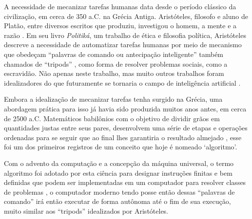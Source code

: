 \newcommand{\texCommand}[1]{\texttt{\textbackslash{#1}}}%

\newcommand{\exemplo}[1]{%
\vspace{\baselineskip}%
\noindent\fbox{\begin{minipage}{\textwidth}#1\end{minipage}}%
\\\vspace{\baselineskip}}%

\newcommand{\exemploVerbatim}[1]{%
\vspace{\baselineskip}%
\noindent\fbox{\begin{minipage}{\textwidth}%
#1\end{minipage}}%
\\\vspace{\baselineskip}}%

A necessidade de mecanizar tarefas humanas data desde o período clássico da
civilização, em cerca de 350 a.C. na Grécia Antiga. Aristóteles, filosofo e
aluno de Platão, entre diversos escritos que produziu, investigou o homem, a
mente e a razão \cite{russell2004history}. Em seu livro \textit{Politiká}, um
trabalho de ética e filosofia política, Aristóteles descreve a necessidade de
automatizar tarefas humanas por meio de mecanismo que obedeçam ``palavras de
comando ou antecipação inteligente'' também chamados de ``tripods''
\cite{2013aristotle}, como forma de resolver problemas sociais, como a
escravidão. Não apenas neste trabalho, mas muito outros trabalhos foram
idealizadores do que futuramente se tornaria o campo de inteligência artificial
\cite{russell2016artificial}.

Embora a idealização de mecanizar tarefas tenha surgido na Grécia, uma
abordagem prática para isso já havia sido produzida muitos anos antes, em cerca
de 2500 a.C. Matemáticos babilônios com o objetivo de dividir grãos em
quantidades justas entre seus pares, desenvolvem uma série de etapas e
operações ordenadas para se seguir que ao final lhes garantiria o resultado
almejado \cite{chabert1999history}, esse foi um dos primeiros registros de um
conceito que hoje é nomeado `algoritmo'.

Com o advento da computação e a concepção da máquina universal, o termo
algoritmo foi adotado por esta ciência para designar instruções finitas e bem
definidas que podem ser implementadas em um computador para resolver classes de
problemas \cite{britannica2006algorithm}, o computador moderno tendo posse
então dessas ``palavras de comando'' irá então executar de forma autônoma até o
fim de sua execução, muito similar aos ``tripods'' idealizados por Aristóteles.

